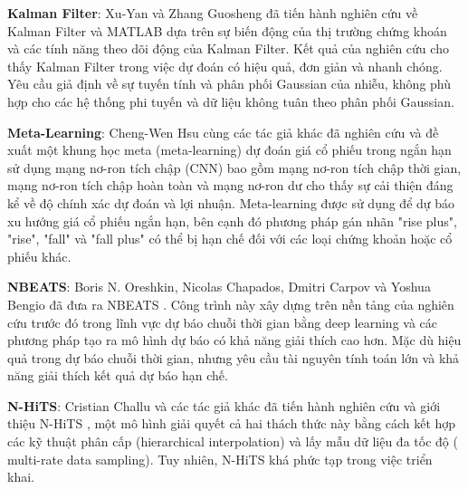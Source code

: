 \par
\textbf{Kalman Filter}: Xu-Yan và Zhang Guosheng \cite{kalmanfilter} đã tiến hành nghiên cứu về Kalman Filter và MATLAB dựa trên sự biến động của thị trường chứng khoán và các tính năng theo dõi động của Kalman Filter. Kết quả của nghiên cứu cho thấy Kalman Filter trong việc dự đoán có hiệu quả, đơn giản và nhanh chóng.
Yêu cầu giả định về sự tuyến tính và phân phối Gaussian của nhiễu, không phù hợp cho các hệ thống phi tuyến và dữ liệu không tuân theo phân phối Gaussian.
\par
\textbf{Meta-Learning}: Cheng-Wen Hsu cùng các tác giả khác \cite{meta} đã nghiên cứu và đề xuất một khung học meta (meta-learning) dự đoán giá cổ phiếu trong ngắn hạn sử dụng mạng nơ-ron tích chập (CNN) bao gồm mạng nơ-ron tích chập thời gian, mạng nơ-ron tích chập hoàn toàn và mạng nơ-ron dư cho thấy sự cải thiện đáng kể về độ chính xác dự đoán và lợi nhuận.
Meta-learning được sử dụng để dự báo xu hướng giá cổ phiếu ngắn hạn, bên cạnh đó phương pháp gán nhãn "rise plus", "rise", "fall" và "fall plus" có thể bị hạn chế đối với các loại chứng khoản hoặc cổ phiếu khác.
\par
\textbf{NBEATS}: Boris N. Oreshkin, Nicolas Chapados, Dmitri Carpov và Yoshua Bengio đã đưa ra NBEATS \cite{nbeats}. Công trình này xây dựng trên nền tảng của nghiên cứu trước đó trong lĩnh vực dự báo chuỗi thời gian bằng deep learning và các phương pháp tạo ra mô hình dự báo có khả năng giải thích cao hơn. %
Mặc dù hiệu quả trong dự báo chuỗi thời gian, nhưng yêu cầu tài nguyên tính toán lớn và khả năng giải thích kết quả dự báo hạn chế.
\par
\textbf{N-HiTS}: Cristian Challu và các tác giả khác đã tiến hành nghiên cứu và giới thiệu N-HiTS \cite{nhits}, một mô hình giải quyết cả hai thách thức này bằng cách kết hợp các kỹ thuật phân cấp (hierarchical interpolation) và lấy mẫu dữ liệu đa tốc độ ( multi-rate data sampling). %
Tuy nhiên, N-HiTS khá phức tạp trong việc triển khai.